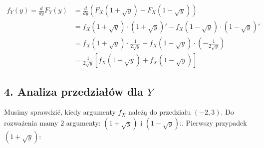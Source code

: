 \documentclass[polish, 10pt]{extarticle}
\begin{document}
\begin{align*}
    f_Y(y) = \frac{d}{dy} F_Y(y) &= \frac{d}{dy} \left( F_X(1+\sqrt{y}) - F_X(1-\sqrt{y}) \right) \\[1em]
    &= f_X(1+\sqrt{y}) \cdot (1+\sqrt{y})' - f_X(1-\sqrt{y}) \cdot (1-\sqrt{y})' \\[1em]
    &= f_X(1+\sqrt{y}) \cdot \frac{1}{2\sqrt{y}} - f_X(1-\sqrt{y}) \cdot \left( -\frac{1}{2\sqrt{y}} \right) \\[1em]
    &= \frac{1}{2\sqrt{y}} \left[ f_X(1+\sqrt{y}) + f_X(1-\sqrt{y}) \right]
\end{align*}

\subsection*{4. Analiza przedziałów dla \(Y\)}
Musimy sprawdzić, kiedy argumenty $f_X$ należą do przedziału \((-2, 3)\). Do rozważenia mamy 2 argumenty: $(1+\sqrt{y})$ i $(1-\sqrt{y})$:. Pierwszy przypadek $(1+\sqrt{y})$:
\end{document}
